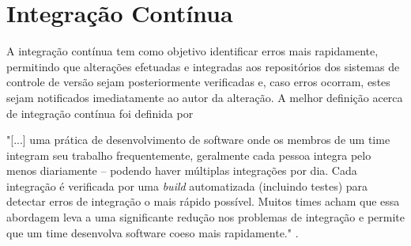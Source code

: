 
\section{Integração Contínua}\label{integracaocont}
\begin{OnehalfSpace}
A integração contínua tem como objetivo identificar erros mais rapidamente, permitindo que alterações efetuadas e integradas aos repositórios dos sistemas de controle de versão sejam posteriormente verificadas e, caso erros ocorram, estes sejam notificados imediatamente ao autor da alteração.
A melhor definição acerca de integração contínua foi definida por 
\end{OnehalfSpace}

\begin{citacao}
"[...] uma prática de desenvolvimento de software onde os membros de um time integram seu trabalho frequentemente, geralmente cada pessoa integra pelo menos diariamente – podendo haver múltiplas integrações por dia. Cada integração é verificada por uma \textit{build} automatizada (incluindo testes) para detectar erros de integração o mais rápido possível. Muitos times acham que essa abordagem leva a uma significante redução nos problemas de integração e permite que um time desenvolva software coeso mais rapidamente." .
\end{citacao}

